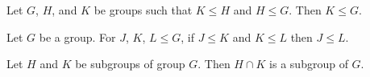 \begin{definition}
    \label{definition : subgroup_trans}
    \leanok
    Let $G$, $H$, and $K$ be groups such that $K \leq H$ and $H \leq G$. Then $K \leq G$.
\end{definition}

\begin{theorem}
    \label{theorem : sgp_trans}
    \leanok
    Let $G$ be a group. For $J$, $K$, $L \leq G$, if $J \leq K$ and $K \leq L$ then $J \leq L$.
\end{theorem}

\begin{definition}
    \label{definition : subgroup_intersection}
    \leanok
    Let $H$ and $K$ be subgroups of group $G$. Then $H \cap K$ is a subgroup of $G$.
\end{definition}
